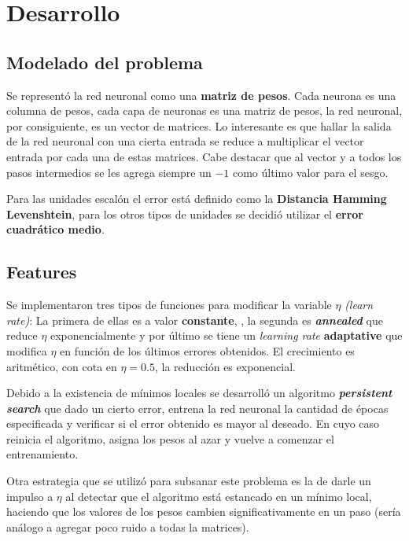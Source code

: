 \documentclass[%
    final,
    reprint,
    notitlepage,
    narroweqnarray,
    inline,
    twoside,
    invited
    ]{ieee}
\begin{document}

\section{Desarrollo}

\subsection{Modelado del problema}

\par Se representó la red neuronal como una \textbf{matriz de pesos}. Cada neurona es una columna de pesos, cada capa de 
neuronas es una matriz de pesos, la red neuronal, por consiguiente, es un vector de matrices. Lo interesante es que hallar 
la salida de la red neuronal con una cierta entrada se reduce a multiplicar el vector entrada por cada una de estas matrices. Cabe destacar 
que al vector y a todos los pasos intermedios se les agrega siempre un $-1$ como último valor para el sesgo.\\

\par Para las unidades escalón el error está definido como la \textbf{Distancia Hamming Levenshtein}, para los 
otros tipos de unidades se decidió utilizar el \textbf{error cuadrático medio}.

\subsection{Features}

\par Se implementaron tres tipos de funciones para modificar la variable $\eta$ \textit{(learn rate)}: 
La primera de ellas es a valor \textbf{constante}, , la segunda es \textbf{\textit{annealed}} que reduce $\eta$ exponencialmente y por último se 
tiene un \textit{learning rate} \textbf{adaptative} que modifica $\eta$ en función de los últimos errores obtenidos. El crecimiento es aritmético, con cota 
en $\eta =0.5$, la reducción es exponencial.

\par Debido a la existencia de mínimos locales se desarrolló un algoritmo  \textbf{\textit{persistent search}} que dado un cierto error, entrena
 la red neuronal la cantidad de épocas especificada y verificar si el error obtenido es mayor al deseado. En cuyo caso 
reinicia el algoritmo, asigna los pesos al azar y vuelve a comenzar el entrenamiento.\\
\par Otra estrategia que se utilizó para subsanar este problema es la de darle un impulso a $\eta$ al detectar que el algoritmo está estancado 
en un mínimo local, haciendo que los valores de los pesos cambien significativamente en un paso (sería análogo a agregar poco ruido a todas la matrices).
\end{document}
